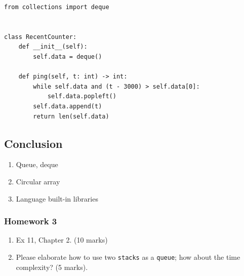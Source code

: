 \documentclass[aspectratio=169, 14pt]{beamer}
\begin{document}
\begin{frame}[fragile]

    \begin{verbatim}
from collections import deque


class RecentCounter:
    def __init__(self):
        self.data = deque()

    def ping(self, t: int) -> int:
        while self.data and (t - 3000) > self.data[0]:
            self.data.popleft()
        self.data.append(t)
        return len(self.data)
        \end{verbatim}

\end{frame}

\begin{frame}
\section{\textcolor{darkmidnightblue}{Conclusion}}
    \begin{enumerate}
        \item Queue, deque
        \item Circular array
        \item Language built-in libraries
    \end{enumerate}
\end{frame}
\begin{frame}
    \frametitle{Homework 3}
\begin{enumerate}
    \item Ex 11, Chapter 2. (10 marks)
    \item Please elaborate how to use two \texttt{stacks} as a \texttt{queue}; how about the time complexity?  (5 marks).
\end{enumerate}
\end{frame}
\end{document}
